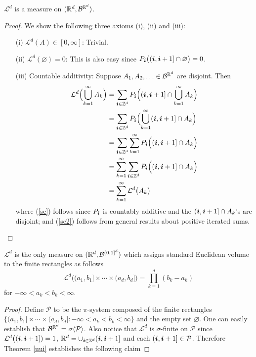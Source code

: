 \begin{theorem}
 $\mathcal L^d$  is a measure on $(\Bbb R^d,\mathcal B^{\Bbb R^d })$.
\end{theorem}
\begin{proof}
We show the following three axioms (i), (ii) and (iii):
\begin{enumerate}
\item[(i)] $\mathcal L^d(A)\in [0,\infty]$: Trivial.
 \item[(ii)]  $\mathcal L^d(\varnothing)=0$: This is also easy since $P_{\boldsymbol i}\bigl( (\boldsymbol i, \boldsymbol i+1]\cap \varnothing\bigr)=0$.
\item[(iii)] Countable additivity: Suppose $A_1,A_2,\ldots\in\mathcal B^{\Bbb R^d }$ are disjoint. Then
\begin{align}
\mathcal L^d\Bigl (\bigcup_{k=1}^\infty A_k\Bigr)&=\sum_{\boldsymbol i\in\Bbb Z^d} P_{\boldsymbol i}\Bigl((\boldsymbol i, \boldsymbol i+1] \cap \bigcup_{k=1}^\infty A_k \Bigr) \nonumber\\
&=\sum_{\boldsymbol i\in\Bbb Z^d} P_{\boldsymbol i}\Bigl( \bigcup_{k=1}^\infty (\boldsymbol i, \boldsymbol i+1] \cap A_k \Bigr) \nonumber\\
&=\sum_{\boldsymbol i\in\Bbb Z^d} \sum_{k=1}^\infty P_{\boldsymbol i} \Bigl((\boldsymbol i, \boldsymbol i+1] \cap A_k \Bigr)\label{se} \\
&=\sum_{k=1}^\infty  \sum_{\boldsymbol i\in\Bbb Z^d} P_{\boldsymbol i} \Bigl((\boldsymbol i, \boldsymbol i+1] \cap A_k \Bigr)\label{se2} \\
&=\sum_{k=1}^\infty  \mathcal L^d\bigl (A_k \bigr) \nonumber
\end{align}
where (\ref{se}) follows since $P_{\boldsymbol i}$ is countably additive and the $ (\boldsymbol i, \boldsymbol i+1]\cap A_k $'s are disjoint; and (\ref{se2}) follows from general results about positive iterated sums.
\end{enumerate}
\end{proof}



 \begin{theorem}
 \label{ui2}
  $\mathcal L^d$ is the only measure on $(\Bbb R^d,\mathcal B^{(0,1]^d})$ which assigns standard Euclidean volume to the finite rectangles as follows
 \begin{equation}
\mathcal L^d \bigl( (a_1,b_1]\times \cdots \times (a_d,b_d]\bigr)=\prod_{k=1}^d (b_k - a_k)
\end{equation}
for $-\infty < a_k < b_k <\infty$.
\end{theorem}
\begin{proof}
Define $\mathcal P$ to be the $\pi$-system composed of the finite rectangles $\{ (a_1,b_1]\times \cdots \times (a_d,b_d]: -\infty < a_k < b_k <\infty\}$ and the empty set $\varnothing$. One can easily establish that $\mathcal B^{\Bbb R^d}=\sigma\langle\mathcal P\rangle$.
 Also notice that $\mathcal L^d$ is $\sigma$-finite on $\mathcal P$ since  $\mathcal L^d\bigl((\boldsymbol i,\boldsymbol i+1])=1$, $\Bbb R^d = \cup_{\boldsymbol i\in\Bbb Z^d} (\boldsymbol i,\boldsymbol i+1]$ and each $(\boldsymbol i,\boldsymbol i+1]\in \mathcal P$.
 Therefore Theorem \ref{uui} establishes the following claim
\end{proof}




